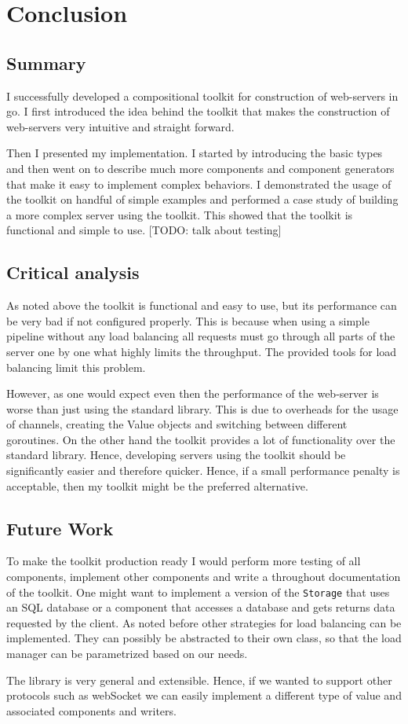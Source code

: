 \section{Conclusion}
\label{sec:conclusion}
\subsection{Summary}
I successfully developed a compositional toolkit for construction of 
web-servers in go. I first introduced the idea behind the toolkit that 
makes the construction of web-servers very intuitive and straight forward. 

Then I presented my implementation. I started by introducing the basic types
and then went on to describe much more components and component generators
that make it easy to implement complex behaviors. I demonstrated the usage of the 
toolkit on handful of simple examples and performed a case study of building
a more complex server using the toolkit. This showed that the toolkit is
functional and simple to use. [TODO: talk about testing] 

\subsection{Critical analysis}
As noted above the toolkit is functional and easy to use, but its performance
can be very bad if not configured properly. This is because when using a simple
pipeline without any load balancing all requests must go through all parts
of the server one by one what highly limits the throughput. The provided
tools for load balancing limit this problem.

However, as one would expect even then the performance of the web-server
is worse than just using the standard library. This is due to overheads
for the usage of channels, creating the Value objects
and switching between different goroutines.
On the other hand the toolkit provides a lot of functionality over the
standard library. Hence, developing servers using the toolkit should be
significantly easier and therefore quicker. Hence, if a small performance
penalty is acceptable, then my toolkit might be the preferred alternative.

\subsection{Future Work}
To make the toolkit production ready I would perform more testing of all
components, implement other components and write a throughout documentation
of the toolkit. One might want to implement a version of the \texttt{Storage}
that uses an SQL database or a component that accesses a database and 
gets returns data requested by the client. As noted before other strategies 
for load balancing can be implemented.
They can possibly be abstracted to their own class, so that the
load manager can be parametrized based on our needs.  

The library is very general and extensible. Hence, if we wanted to support 
other protocols such as webSocket we can easily implement a different 
type of value and associated components and writers. 